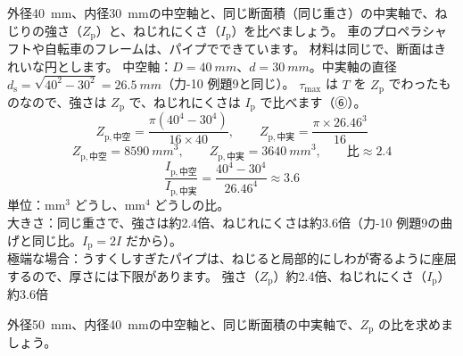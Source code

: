 \begin{phreidai}
\label{ph:力-11:ex8}外径\qty{40}{mm}、内径\qty{30}{mm}の中空軸と、同じ断面積（同じ重さ）の中実軸で、ねじりの強さ（$Z_{\mathrm p}$）と、ねじれにくさ（$I_{\mathrm p}$）を比べましょう。
\phbamen
車のプロペラシャフトや自転車のフレームは、パイプでできています。
\phmushi
材料は同じで、断面はきれいな円とします。
\phzu
中空軸：$D=\qty{40}{mm}$、$d=\qty{30}{mm}$。中実軸の直径 $d_{\mathrm s}=\sqrt{40^2-30^2}=\qty{26.5}{mm}$（力-10 例題9と同じ）。
\phriyu
$\tau_{\max}$ は $T$ を $Z_{\mathrm p}$ でわったものなので、強さは $Z_{\mathrm p}$ で、ねじれにくさは $I_{\mathrm p}$ で比べます（⑥）。
\phtateru
\[ Z_{\mathrm p,\text{中空}}=\frac{\pi(40^4-30^4)}{16\times40},\qquad Z_{\mathrm p,\text{中実}}=\frac{\pi\times26.46^3}{16} \]
\phtoku
\[ Z_{\mathrm p,\text{中空}}=\qty{8590}{mm^3},\qquad Z_{\mathrm p,\text{中実}}=\qty{3640}{mm^3},\qquad \text{比}\approx2.4 \]
\[ \frac{I_{\mathrm p,\text{中空}}}{I_{\mathrm p,\text{中実}}}=\frac{40^4-30^4}{26.46^4}\approx3.6 \]
\phtashikame
単位：mm$^3$ どうし、mm$^4$ どうしの比。\\
大きさ：同じ重さで、強さは約2.4倍、ねじれにくさは約3.6倍（力-10 例題9の曲げと同じ比。$I_{\mathrm p}=2I$ だから）。\\
極端な場合：うすくしすぎたパイプは、ねじると局部的にしわが寄るように座屈するので、厚さには下限があります。
\kotae 強さ（$Z_{\mathrm p}$）約2.4倍、ねじれにくさ（$I_{\mathrm p}$）約3.6倍
\end{phreidai}
\begin{jibun}
外径\qty{50}{mm}、内径\qty{40}{mm}の中空軸と、同じ断面積の中実軸で、$Z_{\mathrm p}$ の比を求めましょう。
\end{jibun}

